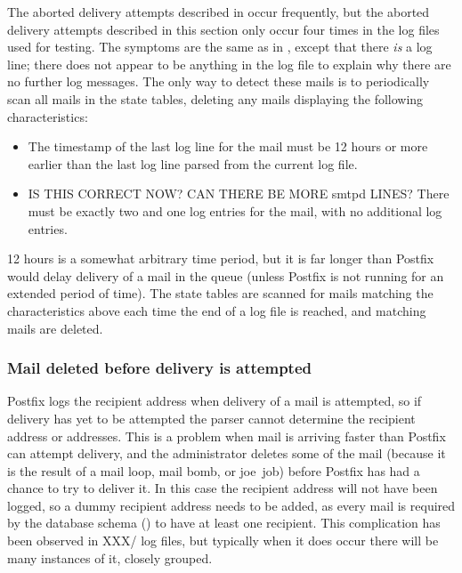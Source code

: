 \label{yet-more-aborted-delivery-attempts}

The aborted delivery attempts described in
 occur frequently, but the aborted
delivery attempts described in this section only occur four times in the
\numberOFlogFILES{} log files used for testing.  The symptoms are the same
as in , except that there
\textit{is\/} a  log line; there does not appear to be
anything in the log file to explain why there are no further log messages.
The only way to detect these mails is to periodically scan all mails in the
state tables, deleting any mails displaying the following characteristics:

\begin{itemize}

    \item The timestamp of the last log line for the mail must be 12 hours
        or more earlier than the last log line parsed from the current log
        file.

    \item IS THIS CORRECT NOW\@?  CAN THERE BE MORE smtpd LINES\@?  There
        must be exactly two  and one  log
        entries for the mail, with no additional log entries.

\end{itemize}

12 hours is a somewhat arbitrary time period, but it is far longer than
Postfix would delay delivery of a mail in the queue (unless Postfix is not
running for an extended period of time).  The state tables are scanned for
mails matching the characteristics above each time the end of a log file is
reached, and matching mails are deleted.

\subsubsection{Mail deleted before delivery is attempted}

\label{Mail deleted before delivery is attempted}

Postfix logs the recipient address when delivery of a mail is attempted, so
if delivery has yet to be attempted the parser cannot determine the
recipient address or addresses.  This is a problem when mail is arriving
faster than Postfix can attempt delivery, and the administrator deletes
some of the mail (because it is the result of a mail loop, mail bomb, or
joe~job) before Postfix has had a chance to try to deliver it.  In this
case the recipient address will not have been logged, so a dummy recipient
address needs to be added, as every mail is required by the database schema
() to have at least one recipient.  This
complication has been observed in XXX/\numberOFlogFILES{} log files, but
typically when it does occur there will be many instances of it, closely
grouped.

